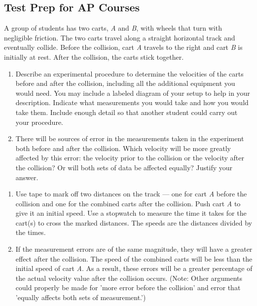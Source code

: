 \documentclass[
]{book}
\providecommand{\tightlist}{%
  \setlength{\itemsep}{0pt}\setlength{\parskip}{0pt}}
\newenvironment{ap-test-prep}{}{}
\begin{document}
\hypertarget{fs-id1283687}{}
\begin{ap-test-prep}

\hypertarget{test-prep-for-ap-courses-2}{%
\subsection{Test Prep for AP Courses}\label{test-prep-for-ap-courses-2}}

\hypertarget{fs-id2172989}{}
\leavevmode\hypertarget{fs-id2066649}{}%
A group of students has two carts, \emph{A} and \emph{B}, with wheels that turn
with negligible friction. The two carts travel along a straight
horizontal track and eventually collide. Before the collision, cart \emph{A}
travels to the right and cart \emph{B} is initially at rest. After the
collision, the carts stick together.

\begin{enumerate}
\def\labelenumi{\alph{enumi}.}
\tightlist
\item
  Describe an experimental procedure to determine the velocities of
  the carts before and after the collision, including all the
  additional equipment you would need. You may include a labeled
  diagram of your setup to help in your description. Indicate what
  measurements you would take and how you would take them. Include
  enough detail so that another student could carry out your
  procedure.
\item
  There will be sources of error in the measurements taken in the
  experiment both before and after the collision. Which velocity will
  be more greatly affected by this error: the velocity prior to the
  collision or the velocity after the collision? Or will both sets of
  data be affected equally? Justify your answer.
\end{enumerate}

\hypertarget{fs-id1336990}{}
\begin{enumerate}
\def\labelenumi{\alph{enumi}.}
\tightlist
\item
  Use tape to mark off two distances on the track --- one for cart \emph{A}
  before the collision and one for the combined carts after the
  collision. Push cart \emph{A} to give it an initial speed. Use a
  stopwatch to measure the time it takes for the cart(s) to cross the
  marked distances. The speeds are the distances divided by the times.
\item
  If the measurement errors are of the same magnitude, they will have
  a greater effect after the collision. The speed of the combined
  carts will be less than the initial speed of cart \emph{A}. As a result,
  these errors will be a greater percentage of the actual velocity
  value after the collision occurs. (Note: Other arguments could
  properly be made for 'more error before the collision' and error
  that 'equally affects both sets of measurement.')
\end{enumerate}

\end{ap-test-prep}
\end{document}

